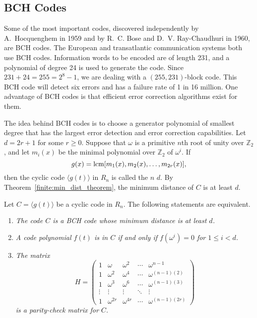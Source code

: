 \subsection*{BCH Codes}
 
Some of the most important codes,
discovered independently by A.~Hocquenghem in 1959 and by R.~C. Bose and D.~V. Ray-Chaudhuri in 1960, are BCH codes.  The European and transatlantic  communication systems both use BCH codes.  Information words to be
encoded are of length 231, and a polynomial of degree 24 is used to
generate the code.  Since $231 + 24 = 255 = 2^8-1$, we are dealing
with a \mbox{$(255, 231)$-block} code. This BCH code will detect six
errors and has a failure rate of 1 in 16 million. One advantage of BCH
codes is that efficient error correction algorithms exist for them. 


The idea behind BCH codes is to choose a generator polynomial of
smallest degree that has the largest error detection and error
correction 
capabilities. Let $d = 2r + 1$ for some $r \geq 0$.  Suppose that
$\omega$ is a primitive $n$th root of unity over ${\mathbb Z}_2$, and
let $m_i(x)$ be the minimal polynomial over ${\mathbb Z}_2$ of
$\omega^i$. If  
\[
g(x) = \operatorname{lcm}[ m_1(x), m_{2}(x), \ldots, m_{2r}(x)],
\]
then the cyclic code $\langle g(t) \rangle$ in $R_n$ is called the
 $n$  $d$.
By Theorem~\ref{finite:min_dist_theorem}, the minimum distance of $C$ is at least $d$. 


\begin{theorem}
Let $C = \langle g(t) \rangle$ be a cyclic code in $R_n$. The
following statements are equivalent. 
\begin{enumerate}

\rm\item\it
The code $C$ is a BCH code whose minimum distance is at least $d$.


\rm\item\it
A code polynomial $f(t)$ is in $C$ if and only if $f( \omega^i) = 0$
for $1 \leq i < d$. 

\rm\item\it
The matrix 
\[
H
=
\begin{pmatrix}
1      & \omega      & \omega^2    & \cdots & \omega^{n-1}\\
1      & \omega^2    & \omega^{4}  & \cdots & \omega^{(n-1)(2)} \\
1      & \omega^3    & \omega^{6}  & \cdots & \omega^{(n-1)(3)} \\
\vdots & \vdots      & \vdots      & \ddots & \vdots \\
1      & \omega^{2r} & \omega^{4r} & \cdots & \omega^{(n-1)(2r)} 
\end{pmatrix}
\]
is a parity-check matrix for $C$.

\end{enumerate}
\end{theorem}


